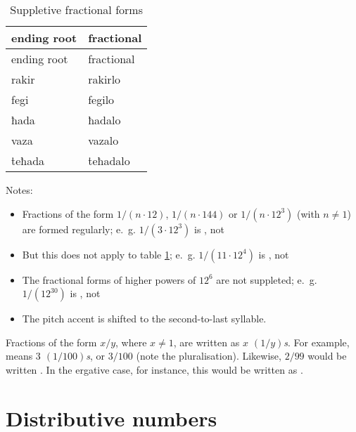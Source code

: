 \documentclass{book}
\begin{document}
\begin{longtable}[c]{|l|l|}
    \caption{Suppletive fractional forms \label{table:supff2}} \\
    
    \hline
    ending root & fractional \\
    \hline
    \endfirsthead
    
    \hline
    ending root & fractional \\
    \hline
    \endhead
    
    \hline
    \endfoot
    
    \hline
    \endlastfoot
    
    rakir & rakirlo \\
    fegi & fegilo \\
    ħada & ħadalo \\
    vaza & vazalo \\
    ṫeħada & ṫeħadalo \\
\end{longtable}

Notes:

\begin{itemize}
    \item Fractions of the form $1/(n \cdot 12)$, $1/(n \cdot 144)$ or $1/(n \cdot 12^3)$ (with $n \ne 1$) are formed regularly; e.~g. $1/(3 \cdot 12^3)$ is , not 
    \item But this does not apply to table \ref{table:supff2}; e.~g. $1/(11 \cdot 12^4)$ is , not 
    \item The fractional forms of higher powers of $12^6$ are not suppleted; e.~g. $1/(12^{30})$ is , not 
    \item The pitch accent is shifted to the second-to-last syllable.
\end{itemize}

Fractions of the form $x/y$, where $x \ne 1$, are written as \emph{$x$ $(1/y)$s}. For example,  means \emph{$3$ $(1/100)$s}, or $3/100$ (note the pluralisation). Likewise, $2/99$ would be written . In the ergative case, for instance, this would be written as .

\section{Distributive numbers}
\end{document}
